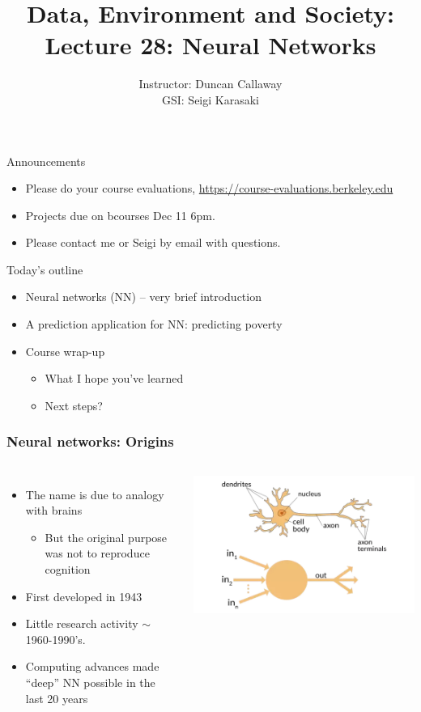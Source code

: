 \documentclass[mathserif, aspectratio=169]{beamer}
\title[Lecture 28] 
{Data, Environment and Society: \\{Lecture 28: Neural Networks}}
\author[ER190C: Data, Environment and Society] 
{Instructor: Duncan Callaway\\
GSI: Seigi Karasaki}
\institute[UC Berkeley] %
 {\small{ \bf December 3, 2018}}
\date[December 3, 2018]
\begin{document}
\frame{
	\titlepage
}


\begin{frame}{Announcements}
	\begin{itemize}
		\item Please do your course evaluations, \url{https://course-evaluations.berkeley.edu}
		\item Projects due on bcourses Dec 11 6pm.
		\item Please contact me or Seigi by email with questions.  
	\end{itemize}
\end{frame}


\begin{frame}{Today's outline}
	\begin{itemize}
		\item Neural networks (NN) -- very brief introduction
		\item A prediction application for NN: predicting poverty
		\item Course wrap-up
		\begin{itemize}
			\item What I hope you've learned
			\item Next steps?
		\end{itemize}
	\end{itemize}
\end{frame}


\begin{frame}
	\frametitle{Neural networks: Origins}
	\begin{columns}[c]
			\begin{itemize}
				\item The name is due to analogy with brains
				\begin{itemize}
					\item But the original purpose was not to reproduce cognition
				\end{itemize}
				\item First developed in 1943
				\item Little research activity $\sim$1960-1990's.  
				\item Computing advances made ``deep'' NN possible in the last 20 years
			\end{itemize}
			\includegraphics[width=\textwidth]{nn_v_ann}
	\end{columns}
\end{frame}
\end{document}
